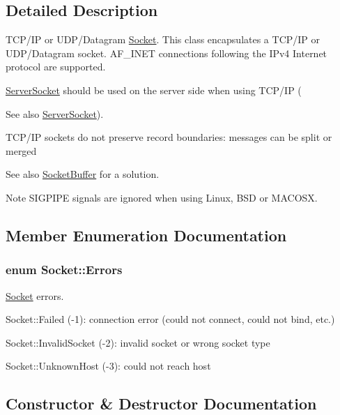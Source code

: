 \subsection{Detailed Description}
T\+C\+P/\+IP or U\+D\+P/\+Datagram \hyperlink{class_socket}{Socket}. This class encapsulates a T\+C\+P/\+IP or U\+D\+P/\+Datagram socket. A\+F\+\_\+\+I\+N\+ET connections following the I\+Pv4 Internet protocol are supported. 

\hyperlink{class_server_socket}{Server\+Socket} should be used on the server side when using T\+C\+P/\+IP (\begin{DoxySeeAlso}{See also}
\hyperlink{class_server_socket}{Server\+Socket}).
\end{DoxySeeAlso}
T\+C\+P/\+IP sockets do not preserve record boundaries\+: messages can be split or merged \begin{DoxySeeAlso}{See also}
\hyperlink{class_socket_buffer}{Socket\+Buffer} for a solution.
\end{DoxySeeAlso}
\begin{DoxyNote}{Note}
S\+I\+G\+P\+I\+PE signals are ignored when using Linux, B\+SD or M\+A\+C\+O\+SX. 
\end{DoxyNote}


\subsection{Member Enumeration Documentation}
\subsubsection[{\texorpdfstring{Errors}{Errors}}]{\setlength{\rightskip}{0pt plus 5cm}enum {\bf Socket\+::\+Errors}}\hypertarget{class_socket_a9f68308228badcdd299cd83e62e36976}{}\label{class_socket_a9f68308228badcdd299cd83e62e36976}


\hyperlink{class_socket}{Socket} errors. 


\begin{DoxyItemize}
\item Socket\+::\+Failed (-\/1)\+: connection error (could not connect, could not bind, etc.)
\item Socket\+::\+Invalid\+Socket (-\/2)\+: invalid socket or wrong socket type
\item Socket\+::\+Unknown\+Host (-\/3)\+: could not reach host 
\end{DoxyItemize}

\subsection{Constructor \& Destructor Documentation}

